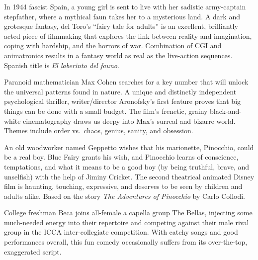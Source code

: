    In 1944 fascist Spain, a young girl is sent to live with her sadistic army-captain stepfather, where a mythical faun takes her to a mysterious land. A dark and grotesque fantasy, del Toro's ``fairy tale for adults'' is an excellent, brilliantly acted piece of filmmaking that explores the link between reality and imagination, coping with hardship, and the horrors of war. Combination of CGI and animatronics results in a fantasy world as real as the live-action sequences. Spanish title is \textit{El laberinto del fauno}. \author{DW} 

\iffalse
\movie{Patton}{1970}{172m}{\four} \dir{Franklin J. Schaffner} \cast{George C. Scott; Karl Malden; Stephen Young}
\fi

   Paranoid mathematician Max Cohen searches for a key number that will unlock the universal patterns found in nature. A unique and distinctly independent psychological thriller, writer/director Aronofsky's first feature proves that big things can be done with a small budget. The film's frenetic, grainy black-and-white cinematography draws us deepy into Max's surreal and bizarre world. Themes include order vs.\ chaos, genius, sanity, and obsession. \author{DW} 

\iffalse
\movie{Piano, The}{1993}{121m}{\four} \dir{Jane Campion} \cast{Holly Hunter; Harvey Keitel; Sam Neill; Anna Paquin} \author{AW} \mpaa{R}
\fi

  An old woodworker named Geppetto wishes that his marionette, Pinocchio, could be a real boy. Blue Fairy grants his wish, and Pinocchio learns of conscience, temptations, and what it means to be a good boy (by being truthful, brave, and unselfish) with the help of Jiminy Cricket. The second theatrical animated Disney film is haunting, touching, expressive, and deserves to be seen by children and adults alike. Based on the story \textit{The Adventures of Pinocchio} by Carlo Collodi. \author{AW}

   College freshman Beca joins all-female a capella group The Bellas, injecting some much-needed energy into their repertoire and competing against their male rival group in the ICCA inter-collegiate competition. With catchy songs and good performances overall, this fun comedy occasionally suffers from its over-the-top, exaggerated script. \author{DW} 

